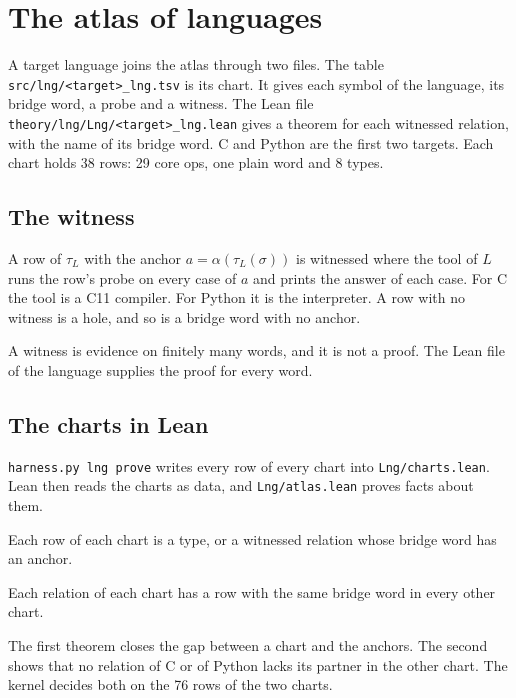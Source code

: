 \chapter{The atlas of languages}
\label{ch:targets}

A target language joins the atlas through two files. The table \texttt{src/lng/<target>\_lng.tsv} is its chart.
It gives each symbol of the language, its bridge word, a probe and a witness. The Lean file
\texttt{theory/lng/Lng/<target>\_lng.lean} gives a theorem for each witnessed relation, with the name of its bridge
word. C and Python are the first two targets. Each chart holds 38 rows: 29 core ops, one plain word and 8 types.

\section{The witness}

\begin{definition}
A row of $\tau_L$ with the anchor $a = \alpha(\tau_L(\sigma))$ is witnessed where the tool of $L$ runs the row's
probe on every case of $a$ and prints the answer of each case. For C the tool is a C11 compiler. For Python it is
the interpreter. A row with no witness is a hole, and so is a bridge word with no anchor.
\end{definition}

A witness is evidence on finitely many words, and it is not a proof. The Lean file of the language supplies the
proof for every word.

\section{The charts in Lean}

\texttt{harness.py lng prove} writes every row of every chart into \texttt{Lng/charts.lean}. Lean then reads the
charts as data, and \texttt{Lng/atlas.lean} proves facts about them.

\begin{theorem}
Each row of each chart is a type, or a witnessed relation whose bridge word has an anchor.
\end{theorem}

\begin{theorem}
Each relation of each chart has a row with the same bridge word in every other chart.
\end{theorem}

The first theorem closes the gap between a chart and the anchors. The second shows that no relation of C or of
Python lacks its partner in the other chart. The kernel decides both on the 76 rows of the two charts.

